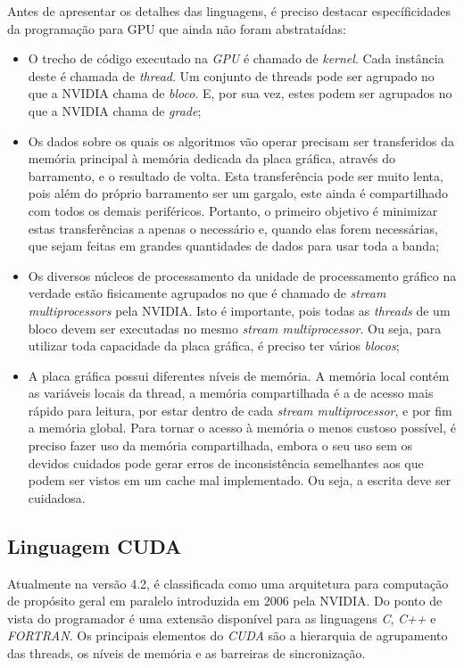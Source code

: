 Antes de apresentar os detalhes das linguagens, é preciso destacar específicidades da programação para GPU que ainda não foram abstrataídas:

\begin{itemize}
  \item O trecho de código executado na \textit{GPU} é chamado de \textit{kernel}. Cada instância deste é chamada de \textit{thread}. Um conjunto de threads pode ser agrupado no que a NVIDIA chama de \textit{bloco}. E, por sua vez, estes podem ser agrupados no que a NVIDIA chama de \textit{grade};
  \item Os dados sobre os quais os algoritmos vão operar precisam ser transferidos da memória principal à memória dedicada da placa gráfica, através do barramento, e o resultado de volta. Esta transferência pode ser muito lenta, pois além do próprio barramento ser um gargalo, este ainda é compartilhado com todos os demais periféricos. Portanto, o primeiro objetivo é minimizar estas transferências a apenas o necessário e, quando elas forem necessárias, que sejam feitas em grandes quantidades de dados para usar toda a banda;
  \item Os diversos núcleos de processamento da unidade de processamento gráfico na verdade estão fisicamente agrupados no que é chamado de \textit{stream multiprocessors} pela NVIDIA. Isto é importante, pois todas as \textit{threads} de um bloco devem ser executadas no mesmo \textit{stream multiprocessor}. Ou seja, para utilizar toda capacidade da placa gráfica, é preciso ter vários \textit{blocos};
  \item A placa gráfica possui diferentes níveis de memória. A memória local contém as variáveis locais da thread, a memória compartilhada é a de acesso mais rápido para leitura, por estar dentro de cada \textit{stream multiprocessor}, e por fim a memória global. Para tornar o acesso à memória o menos custoso possível, é preciso fazer uso da memória compartilhada, embora o seu uso sem os devidos cuidados pode gerar erros de inconsistência semelhantes aos que podem ser vistos em um cache mal implementado. Ou seja, a escrita deve ser cuidadosa.
\end{itemize}
  \subsection{Linguagem CUDA}
  Atualmente na versão 4.2, é classificada como uma arquitetura para computação de propósito geral em paralelo introduzida em 2006 pela NVIDIA. Do ponto de vista do programador é uma extensão disponível para as linguagens \textit{C}, \textit{C++} e \textit{FORTRAN}. Os principais elementos do \textit{CUDA} são a hierarquia de agrupamento das threads, os níveis de memória e as barreiras de sincronização.
  
